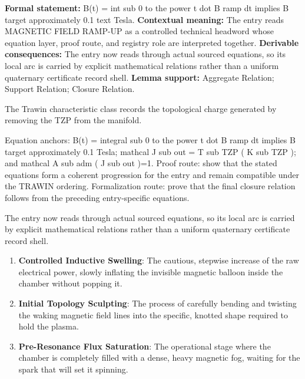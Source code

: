 \begingroup\footnotesize\setlength{\emergencystretch}{3em}\sloppy
\textbf{Formal statement:} B(t) = int sub 0 to the power t dot B ramp dt implies B target approximately 0.1 text Tesla. \textbf{Contextual meaning:} The entry reads MAGNETIC FIELD RAMP-UP as a controlled technical headword whose equation layer, proof route, and registry role are interpreted together. \textbf{Derivable consequences:} The entry now reads through actual sourced equations, so its local arc is carried by explicit mathematical relations rather than a uniform quaternary certificate record shell. \textbf{Lemma support:} Aggregate Relation; Support Relation; Closure Relation.\par
\endgroup

The Trawin characteristic class records the topological charge generated by removing the TZP from the manifold.

Equation anchors: B(t) = integral sub 0 to the power t dot B ramp dt implies B target approximately 0.1 Tesla; mathcal J sub out = T sub TZP ( K sub TZP ); and mathcal A sub adm ( J sub out )=1. Proof route: show that the stated equations form a coherent progression for the entry and remain compatible under the TRAWIN ordering. Formalization route: prove that the final closure relation follows from the preceding entry-specific equations.

The entry now reads through actual sourced equations, so its local arc is carried by explicit mathematical relations rather than a uniform quaternary certificate record shell.
\endgroup

\begin{enumerate}[leftmargin=1.6em,itemsep=6pt,topsep=4pt]
\item \textbf{Controlled Inductive Swelling}: The cautious, stepwise increase of the raw electrical power, slowly inflating the invisible magnetic balloon inside the chamber without popping it.
\item \textbf{Initial Topology Sculpting}: The process of carefully bending and twisting the waking magnetic field lines into the specific, knotted shape required to hold the plasma.
\item \textbf{Pre-Resonance Flux Saturation}: The operational stage where the chamber is completely filled with a dense, heavy magnetic fog, waiting for the spark that will set it spinning.
\end{enumerate}

